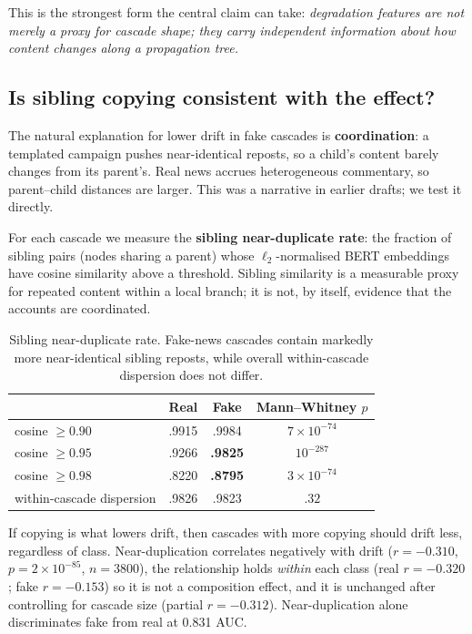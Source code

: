 \documentclass[10pt,twocolumn]{article}
\begin{document}
This is the strongest form the central claim can take: \emph{degradation
features are not merely a proxy for cascade shape; they carry independent
information about how content changes along a propagation tree.}

\subsection{Is sibling copying consistent with the effect?}
\label{sec:mechanism}

The natural explanation for lower drift in fake cascades is \textbf{coordination}:
a templated campaign pushes near-identical reposts, so a child's content barely
changes from its parent's. Real news accrues heterogeneous commentary, so
parent--child distances are larger. This was a narrative in earlier drafts; we
test it directly.

For each cascade we measure the \textbf{sibling near-duplicate rate}: the
fraction of sibling pairs (nodes sharing a parent) whose $\ell_2$-normalised
BERT embeddings have cosine similarity above a threshold. Sibling similarity is
a measurable proxy for repeated content within a local branch; it is not, by
itself, evidence that the accounts are coordinated.

\begin{table}[t]
  \centering
  \caption{Sibling near-duplicate rate. Fake-news cascades contain markedly
  more near-identical sibling reposts, while overall within-cascade dispersion
  does not differ.}
  \label{tab:mechanism}
  \footnotesize
  \setlength{\tabcolsep}{3pt}
  \begin{tabular}{lccc}
    \toprule
    & Real & Fake & Mann--Whitney $p$ \\
    \midrule
    cosine $\ge 0.90$ & .9915 & .9984 & $7\times10^{-74}$ \\
    cosine $\ge 0.95$ & .9266 & \textbf{.9825} & $10^{-287}$ \\
    cosine $\ge 0.98$ & .8220 & \textbf{.8795} & $3\times10^{-74}$ \\
    within-cascade dispersion & .9826 & .9823 & $.32$ \\
    \bottomrule
  \end{tabular}
\end{table}

If copying is what lowers drift, then cascades with more copying should drift
less, regardless of class. Near-duplication correlates negatively with drift
($r=-0.310$, $p=2\times10^{-85}$, $n=3800$), the relationship holds
\emph{within} each class (real $r=-0.320$; fake $r=-0.153$) so it is not a
composition effect, and it is unchanged after controlling for cascade size
(partial $r=-0.312$). Near-duplication alone discriminates fake from real at
0.831 AUC.
\end{document}
